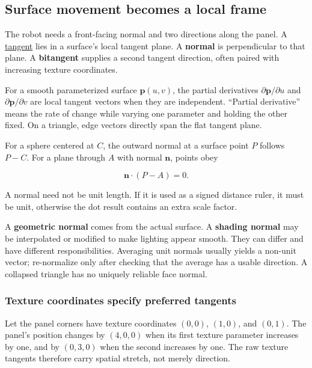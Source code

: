\subsection{Surface movement becomes a local frame}\label{01-foundations-i-ch017-surface-movement-becomes-a-local-frame}

The robot needs a front-facing normal and two directions along the panel. A \hyperref[01-foundations-i-ch017-surface-movement-becomes-a-local-frame]{tangent} lies in a surface's local tangent plane. A \textbf{normal} is perpendicular to that plane. A \textbf{bitangent} supplies a second tangent direction, often paired with increasing texture coordinates.

For a smooth parameterized surface \(\mathbf p(u,v)\), the partial derivatives \(\partial\mathbf p/\partial u\) and \(\partial\mathbf p/\partial v\) are local tangent vectors when they are independent. ``Partial derivative'' means the rate of change while varying one parameter and holding the other fixed. On a triangle, edge vectors directly span the flat tangent plane.

For a sphere centered at \(C\), the outward normal at a surface point \(P\) follows \(P-C\). For a plane through \(A\) with normal \(\mathbf n\), points obey

\[
\mathbf n\cdot(P-A)=0.
\]

A normal need not be unit length. If it is used as a signed distance ruler, it must be unit, otherwise the dot result contains an extra scale factor.

A \textbf{geometric normal} comes from the actual surface. A \textbf{shading normal} may be interpolated or modified to make lighting appear smooth. They can differ and have different responsibilities. Averaging unit normals usually yields a non-unit vector; re-normalize only after checking that the average has a usable direction. A collapsed triangle has no uniquely reliable face normal.

\subsubsection{Texture coordinates specify preferred tangents}\label{01-foundations-i-ch017-texture-coordinates-specify-preferred-tangents}

Let the panel corners have texture coordinates \((0,0)\), \((1,0)\), and \((0,1)\). The panel's position changes by \((4,0,0)\) when its first texture parameter increases by one, and by \((0,3,0)\) when the second increases by one. The raw texture tangents therefore carry spatial stretch, not merely direction.

